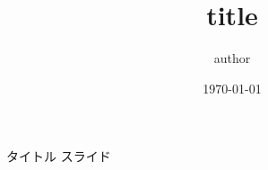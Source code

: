 \documentclass[unicode,aspectratio=169]{beamer} %
\title{title}
\author{author}
\date{\today}
\begin{document}
\maketitle

\begin{frame}{タイトル}
    スライド
\end{frame}
\end{document}
